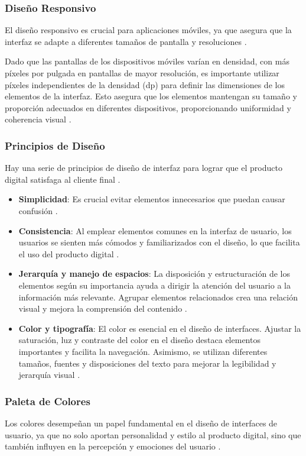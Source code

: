 \subsubsection{Diseño Responsivo}
El diseño responsivo es crucial para aplicaciones móviles, ya que asegura que la interfaz se adapte a diferentes tamaños de pantalla y resoluciones \cite{Becos2024}.

Dado que las pantallas de los dispositivos móviles varían en densidad, con más píxeles por pulgada en pantallas de mayor resolución, es importante utilizar píxeles independientes de la densidad (dp) para definir las dimensiones de los elementos de la interfaz. Esto asegura que los elementos mantengan su tamaño y proporción adecuados en diferentes dispositivos, proporcionando uniformidad y coherencia visual \cite{Pickaso2022}.

\subsubsection{Principios de Diseño}
Hay una serie de principios de diseño de interfaz para lograr que el producto digital satisfaga al cliente final \cite{AnonimoUX}.

\begin{itemize}
    \item \textbf{Simplicidad}: Es crucial evitar elementos innecesarios que puedan causar confusión \cite{AnonimoUX}.
    \item \textbf{Consistencia}: Al emplear elementos comunes en la interfaz de usuario, los usuarios se sienten más cómodos y familiarizados con el diseño, lo que facilita el uso del producto digital \cite{AnonimoUX}.
    \item \textbf{Jerarquía y manejo de espacios}: La disposición y estructuración de los elementos según su importancia ayuda a dirigir la atención del usuario a la información más relevante. Agrupar elementos relacionados crea una relación visual y mejora la comprensión del contenido \cite{AnonimoUX}.
    \item \textbf{Color y tipografía}: El color es esencial en el diseño de interfaces. Ajustar la saturación, luz y contraste del color en el diseño destaca elementos importantes y facilita la navegación. Asimismo, se utilizan diferentes tamaños, fuentes y disposiciones del texto para mejorar la legibilidad y jerarquía visual \cite{AnonimoUX}.
\end{itemize}

\subsubsection{Paleta de Colores}
Los colores desempeñan un papel fundamental en el diseño de interfaces de usuario, ya que no solo aportan personalidad y estilo al producto digital, sino que también influyen en la percepción y emociones del usuario \cite{EspacioUXSF}.

